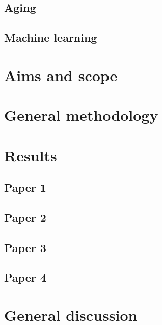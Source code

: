 \documentclass{book}
\begin{document}
    \section{Aging}
    \label{theory:aging}
        
    
    \section{Machine learning}
    \label{theory:ml}
     
    
\chapter{Aims and scope}
\label{aims_scope}


\chapter{General methodology}
\label{methods}


\chapter{Results}
    \section{Paper 1}
    \label{chap:paper1}

    \section{Paper 2}
    \label{chap:paper2}

    \section{Paper 3}
    \label{chap:paper3}

    \section{Paper 4}
    \label{chap:paper4}
    
\chapter{General discussion}
\label{chap:discussion}

\printbibliography
\end{document}
